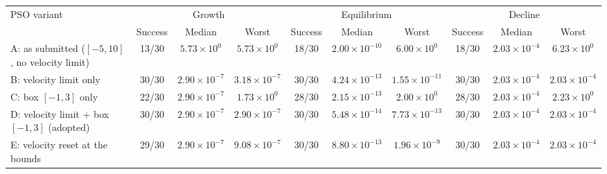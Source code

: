 \begin{tabular}{lccccccccc}
\toprule
PSO variant & \multicolumn{3}{c}{Growth} & \multicolumn{3}{c}{Equilibrium} & \multicolumn{3}{c}{Decline}\\
\cmidrule(lr){2-4}\cmidrule(lr){5-7}\cmidrule(lr){8-10}
 & Success & Median & Worst & Success & Median & Worst & Success & Median & Worst\\
\midrule
A: as submitted ($[-5,10]$, no velocity limit) & 13/30 & $5.73\times10^{0}$ & $5.73\times10^{0}$ & 18/30 & $2.00\times10^{-10}$ & $6.00\times10^{0}$ & 18/30 & $2.03\times10^{-4}$ & $6.23\times10^{0}$\\
B: velocity limit only & 30/30 & $2.90\times10^{-7}$ & $3.18\times10^{-7}$ & 30/30 & $4.24\times10^{-13}$ & $1.55\times10^{-11}$ & 30/30 & $2.03\times10^{-4}$ & $2.03\times10^{-4}$\\
C: box $[-1,3]$ only & 22/30 & $2.90\times10^{-7}$ & $1.73\times10^{0}$ & 28/30 & $2.15\times10^{-13}$ & $2.00\times10^{0}$ & 28/30 & $2.03\times10^{-4}$ & $2.23\times10^{0}$\\
D: velocity limit + box $[-1,3]$ (adopted) & 30/30 & $2.90\times10^{-7}$ & $2.90\times10^{-7}$ & 30/30 & $5.48\times10^{-14}$ & $7.73\times10^{-13}$ & 30/30 & $2.03\times10^{-4}$ & $2.03\times10^{-4}$\\
E: velocity reset at the bounds & 29/30 & $2.90\times10^{-7}$ & $9.08\times10^{-7}$ & 30/30 & $8.80\times10^{-13}$ & $1.96\times10^{-9}$ & 30/30 & $2.03\times10^{-4}$ & $2.03\times10^{-4}$\\
\bottomrule
\end{tabular}
